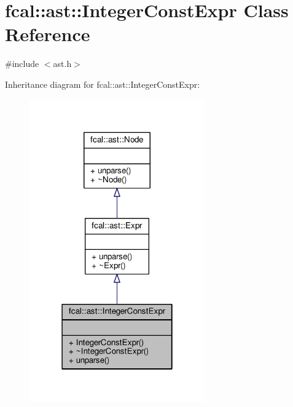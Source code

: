 \hypertarget{classfcal_1_1ast_1_1IntegerConstExpr}{}\section{fcal\+:\+:ast\+:\+:Integer\+Const\+Expr Class Reference}
\label{classfcal_1_1ast_1_1IntegerConstExpr}


{\ttfamily \#include $<$ast.\+h$>$}



Inheritance diagram for fcal\+:\+:ast\+:\+:Integer\+Const\+Expr\+:
\nopagebreak
\begin{figure}[H]
\begin{center}
\leavevmode
\includegraphics[width=214pt]{classfcal_1_1ast_1_1IntegerConstExpr__inherit__graph}
\end{center}
\end{figure}


